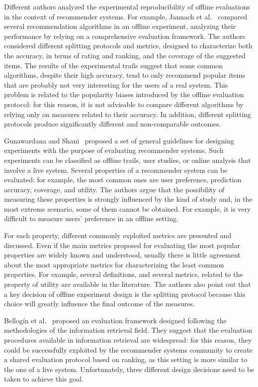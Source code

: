 Different authors analyzed the experimental reproducibility of offline evaluations in the context of recommender systems. For example, Jannach et al.~\cite{Jannach2015} compared several recommendation algorithms in an offline experiment, analyzing their performance by relying on a comprehensive evaluation framework. The authors considered different splitting protocols and metrics, designed to characterize both the accuracy, in terms of rating and ranking, and the coverage of the suggested items. The results of the experimental trails suggest that some common algorithms, despite their high accuracy, tend to only recommend popular items that are probably not very interesting for the users of a real system. This problem is related to the popularity biases introduced by the offline evaluation protocol: for this reason, it is not advisable to compare different algorithms by relying only on measures related to their accuracy. In addition, different splitting protocols produce significantly different and non-comparable outcomes.

Gunawardana and Shani~\cite{Gunawardana2015} proposed a set of general guidelines for designing experiments with the purpose of evaluating recommender systems. Such experiments can be classified as offline trails, user studies, or online analysis that involve a live system. Several properties of a recommender system can be evaluated: for example, the most common ones are user preference, prediction accuracy, coverage, and utility. The authors argue that the possibility of measuring these properties is strongly influenced by the kind of study and, in the most extreme scenario, some of them cannot be obtained. For example, it is very difficult to measure users' preference in an offline setting.

For each property, different commonly exploited metrics are presented and discussed. Even if the main metrics proposed for evaluating the most popular properties are widely known and understood, usually there is little agreement about the most appropriate metrics for characterizing the least common properties. For example, several definitions, and several metrics, related to the property of utility are available in the literature. The authors also point out that a key decision of offline experiment design is the splitting protocol because this choice will greatly influence the final outcome of the measures.

Bellog\'in et al.~\cite{Bellogin2017} proposed an evaluation framework designed following the methodologies of the information retrieval field. They suggest that the evaluation procedures available in information retrieval are widespread: for this reason, they could be successfully exploited by the recommender systems community to create a shared evaluation protocol based on ranking, as this setting is more similar to the one of a live system. Unfortunately, three different design decisions need to be taken to achieve this goal.

